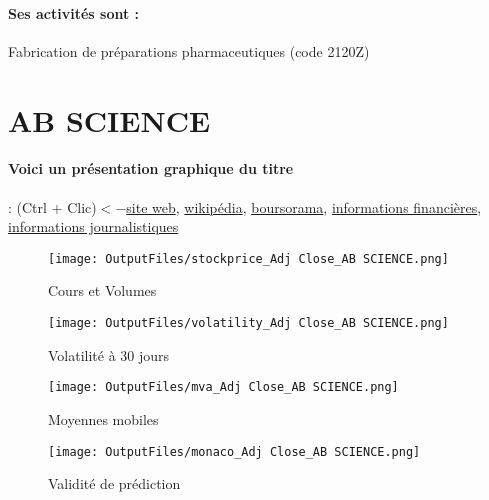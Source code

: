 \documentclass[11pt,a4paper]{report}%
\begin{document}
\paragraph{Ses activités sont : } Fabrication de préparations pharmaceutiques (code 2120Z)  
    
    \newpage

\section{AB SCIENCE}

\paragraph{Voici un présentation graphique du titre} : (Ctrl + Clic)$<-$\href{http://www.ab-science.com/}{site web}, \href{https://fr.wikipedia.org/wiki/AB_Science}{wikipédia}, \href{https://www.boursorama.com/cours/1rPAB}{boursorama}, \href{https://www.qwant.com/?q=site:https:%2f%2fwww.easybourse.com%2faction-societe%2fAB-SCIENCE&t=web&client=ext-firefox-hp}{informations financières}, \href{https://bourse.lerevenu.com/cours-de-bourse/fiche-valeur-synthese/AB-SCIENCE/AB-FR}{informations journalistiques}
\begin{figure}[!htb]
   \begin{minipage}{0.5\textwidth}
     \centering
     \texttt{[image: OutputFiles/stockprice\_Adj Close\_AB SCIENCE.png]}
     \caption{Cours et Volumes}\label{Fig:price_AB SCIENCE}
   \end{minipage}\hfill
   \begin{minipage}{0.5\textwidth}
     \centering
     \texttt{[image: OutputFiles/volatility\_Adj Close\_AB SCIENCE.png]}
     \caption{Volatilité à 30 jours}\label{Fig:volat_AB SCIENCE}
   \end{minipage}
\end{figure}
\begin{figure}[!htb]
   \begin{minipage}{0.5\textwidth}
     \centering
     \texttt{[image: OutputFiles/mva\_Adj Close\_AB SCIENCE.png]}
     \caption{Moyennes mobiles}\label{Fig:mva_AB SCIENCE}
   \end{minipage}\hfill
   \begin{minipage}{0.5\textwidth}
     \centering
     \texttt{[image: OutputFiles/monaco\_Adj Close\_AB SCIENCE.png]}
     \caption{Validité de prédiction}\label{Fig:prediction_AB SCIENCE}
   \end{minipage}
\end{figure}
\end{document}
